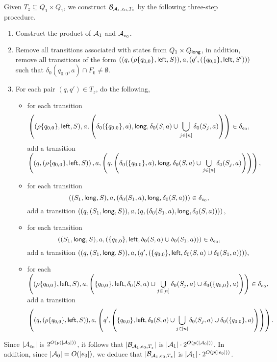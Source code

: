 Given $T_z \subseteq Q_1 \times Q_1$, we construct $\mathcal{B}_{\mathcal{A}_1, e_0,  T_{z}}$ by  the following three-step procedure.
\begin{enumerate}
\item Construct the product of $\mathcal{A}_1$ and $\mathcal{A}_{e_0}$.

\item Remove all transitions associated with states from $Q_1 \times Q_{\mathsf{long}}$, in addition, remove all transitions of the form $((q, (\rho\{q_{0,0}\}, \mathsf{left}, S)), a, (q', (\{q_{0,0}\}, \mathsf{left},S')))$ such that $\delta_0(q_{0,0},a) \cap F_0 \neq \emptyset$.

\item For each pair $(q,q') \in T_{z}$, do the following,
\begin{itemize}
\item for each transition
%
%
$$\left((\rho \{q_{0,0}\}, \mathsf{left}, S), a, \left(\delta_0(\{q_{0,0}\}, a), \mathsf{long}, \delta_0(S, a) \cup \bigcup \limits_{j \in [n]} \delta_0(S_j, a) \right) \right) \in \delta_{e_0},$$
%
%
add a transition
%
%
$\left( \left(q, (\rho \{q_{0,0}\}, \mathsf{left}, S) \right), a, \left(q, \left(\delta_0(\{q_{0,0}\}, a), \mathsf{long}, \delta_0(S, a) \cup \bigcup \limits_{j \in [n]} \delta_0(S_j, a) \right) \right) \right),$
%
%
%
\item for each transition
		$$((S_1, \mathsf{long}, S), a, (\delta_0(S_1,a), \mathsf{long}, \delta_0(S,a))) \in \delta_{e_0},$$
add a transition
$\left((q, (S_1, \mathsf{long}, S)), a, (q, (\delta_0(S_1,a), \mathsf{long}, \delta_0(S,a))) \right),$
%
\item for each transition
		$$((S_1, \mathsf{long}, S), a, (\{q_{0,0}\}, \mathsf{left}, \delta_0(S,a) \cup \delta_0(S_1,a))) \in \delta_{e_0},$$
add a transition
		$((q, (S_1, \mathsf{long}, S)), a, (q', (\{q_{0,0}\}, \mathsf{left}, \delta_0(S,a) \cup \delta_0(S_1,a)))),$
%
\item for each
%
%
		$\left(
		(\rho \{q_{0,0}\}, \mathsf{left}, S), a,
		\left(\{q_{0,0}\}, \mathsf{left}, \delta_0(S,a) \cup \bigcup \limits_{j \in [n]} \delta_0(S_j, a) \cup \delta_0(\{q_{0,0}\}, a) \right)
		\right) \in \delta_{e_0},$
%
%
add a transition
%
		$$\left(
		(q, (\rho \{q_{0,0}\}, \mathsf{left}, S)), a,
		\left(q', \left(\{q_{0,0}\}, \mathsf{left}, \delta_0(S,a) \cup \bigcup \limits_{j \in [n]} \delta_0(S_j, a) \cup \delta_0(\{q_{0,0}\}, a) \right)\right)
		\right).$$
%
\end{itemize}
\end{enumerate}
Since $|\mathcal{A}_{e_0}|$ is $2^{O(p(|\mathcal{A}_0|))}$, it follows that $|\mathcal{B}_{\mathcal{A}_1, e_0, T_z}|$ is $|\mathcal{A}_1| \cdot 2^{O(p(|\mathcal{A}_0|))}$. In addition, since $|\mathcal{A}_0|=O(|e_0|)$, we deduce that $|\mathcal{B}_{\mathcal{A}_1, e_0, T_z}|$ is $|\mathcal{A}_1| \cdot 2^{O(p(|e_0|))}$.

